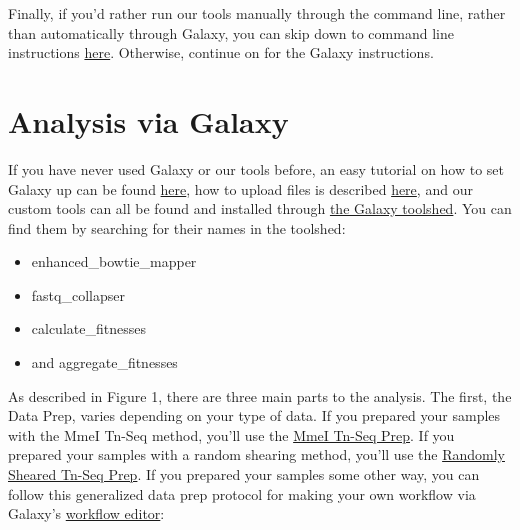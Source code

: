 \documentclass{article}
\begin{document}
\vspace{5 mm}

\noindent
Finally, if you'd rather run our tools manually through the command line, rather than automatically through Galaxy, you can skip down to command line instructions \hyperref[sec:command]{here}. Otherwise, continue on for the Galaxy instructions.

\newpage

























\section{Analysis via Galaxy}

\vspace{2 mm}

\noindent
If you have never used Galaxy or our tools before, an easy tutorial on how to set Galaxy up can be found \href{https://wiki.galaxyproject.org/Admin/GetGalaxy}{here}, how to upload files is described \href{https://wiki.galaxyproject.org/Admin/DataLibraries/UploadingLibraryFiles}{here}, and our custom tools can all be found and installed through \href{https://wiki.galaxyproject.org/Admin/Tools/AddToolFromToolShedTutorial}{the Galaxy toolshed}. You can find them by searching for their names in the toolshed: 

\begin{itemize}
\item enhanced\_bowtie\_mapper
\item fastq\_collapser
\item calculate\_fitnesses
\item and aggregate\_fitnesses

\end{itemize}


\vspace{2 mm}

\noindent
As described in Figure 1, there are three main parts to the analysis. The first, the Data Prep, varies depending on your type of data. If you prepared your samples with the MmeI Tn-Seq method, you'll use the \hyperref[subsec:mmei]{MmeI Tn-Seq Prep}. If you prepared your samples with a random shearing method, you'll use the \hyperref[subsec:random]{Randomly Sheared Tn-Seq Prep}. If you prepared your samples some other way, you can follow this generalized data prep protocol for making your own workflow via Galaxy's \href{https://wiki.galaxyproject.org/Learn/AdvancedWorkflow}{workflow editor}:
\end{document}
